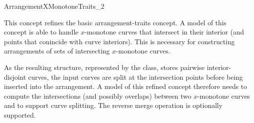 
\ccRefPageBegin

\begin{ccRefConcept}{ArrangementXMonotoneTraits_2}

\ccThreeToTwo

\ccDefinition

This concept refines the basic arrangement-traits concept. A model of
this concept is able to handle $x$-monotone curves that intersect in
their interior (and points that conincide with curve interiors). This
is necessary for constructing arrangements of sets of intersecting
$x$-monotone curves.

As the resulting structure, represented by the  class,
stores pairwise interior-disjoint curves, the input curves are split at
the intersection points before being inserted into the arrangement. 
A model of this refined concept therefore needs to compute the intersections
(and possibly overlaps) between two $x$-monotone curves and to support
curve splitting. The reverse merge operation is optionally supported.

\ccRefines
{}



\ccTypes




\ccThreeToTwo


\end{ccRefConcept}
